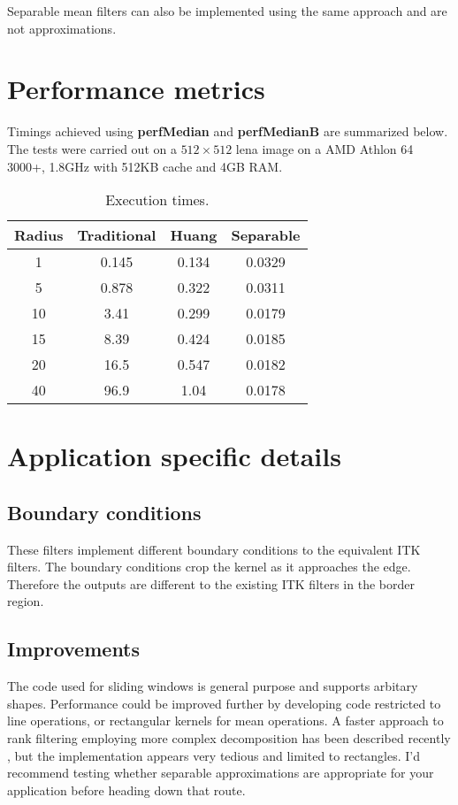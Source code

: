 \documentclass{InsightArticle}
\begin{document}
Separable mean filters can also be implemented using the same approach
and are not approximations.
\section{Performance metrics}
Timings achieved using {\bf perfMedian} and {\bf perfMedianB} are
summarized below. The tests were carried out on a $512 \times 512$
lena image on a AMD Athlon 64 3000+, 1.8GHz with 512KB cache and 4GB RAM.

\begin{table}[htbp]
\centering
\begin{tabular}{|c|c|c|c|}
\hline
Radius & Traditional & Huang & Separable \\
\hline
\hline
1    &   0.145 &  0.134 &  0.0329 \\
5    &   0.878 &  0.322 &  0.0311 \\
10   &   3.41  &  0.299 &  0.0179 \\
15   &   8.39  &  0.424 &  0.0185 \\
20   &   16.5  &  0.547 &  0.0182 \\
40   &   96.9  &  1.04  &  0.0178 \\
\hline
\end{tabular}
\caption{Execution times. \label{tbl:perf}}
\end{table}

\section{Application specific details}
\subsection{Boundary conditions}
These filters implement different boundary conditions to the
equivalent ITK filters. The boundary conditions crop the kernel as it
approaches the edge. Therefore the outputs are different to the
existing ITK filters in the border region.

\subsection{Improvements}
The code used for sliding windows is general purpose and supports
arbitary shapes. Performance could be improved further by developing
code restricted to line operations, or rectangular kernels for mean
operations. A faster approach to rank filtering employing more complex
decomposition has been described recently \cite{Weiss}, but the
implementation appears very tedious and limited to rectangles. I'd
recommend testing whether separable approximations are appropriate for
your application before heading down that route.

\appendix





\nocite{ITKSoftwareGuide}
\end{document}
